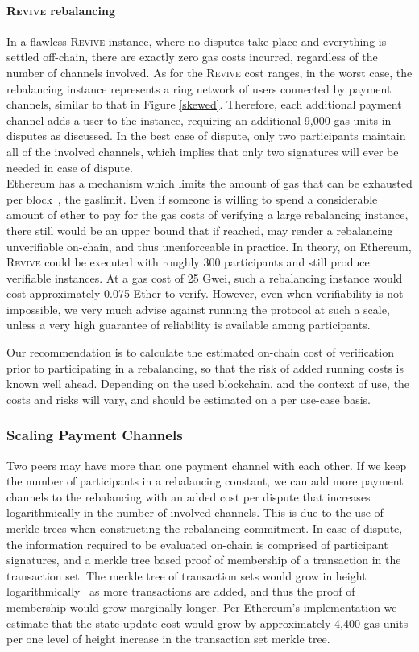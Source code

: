 \documentclass[sigconf]{acmart}
\newcommand{\name}{\textsc{Revive}\xspace}
\begin{document}
\paragraph{\name rebalancing}
In a flawless \name instance, where no disputes take place and everything is settled off-chain, there are exactly zero gas costs incurred, regardless of the number of channels involved.
As for the \name cost ranges, in the worst case, the rebalancing instance represents a ring network of users connected by payment channels, similar to that in Figure \ref{skewed}. Therefore, each additional payment channel adds a user to the instance, requiring an additional 9,000 gas units in disputes as discussed. In the best case of dispute, only two participants maintain all of the involved channels, which implies that only two signatures will ever be needed in case of dispute.\\

Ethereum has a mechanism which limits the amount of gas that can be exhausted per block~\cite{wood2014ethereum}, the gaslimit. Even if someone is willing to spend a considerable amount of ether to pay for the gas costs of verifying a large rebalancing instance, there still would be an upper bound that if reached, may render a rebalancing unverifiable on-chain, and thus unenforceable in practice.
In theory, on Ethereum, \name could be executed with roughly 300 participants and still produce verifiable instances. At a gas cost of 25 Gwei, such a rebalancing instance would cost approximately 0.075 Ether to verify. However, even when verifiability is not impossible, we very much advise against running the protocol at such a scale, unless a very high guarantee of reliability is available among participants.

Our recommendation is to calculate the estimated on-chain cost of verification prior to participating in a rebalancing, so that the risk of added running costs is known well ahead. Depending on the used blockchain, and the context of use, the costs and risks will vary, and should be estimated on a per use-case basis.

\subsubsection{Scaling Payment Channels}
Two peers may have more than one payment channel with each other. If we keep the number of participants in a rebalancing constant, we can add more payment channels to the rebalancing with an added cost per dispute that increases logarithmically in the number of involved channels. This is due to the use of merkle trees when constructing the rebalancing commitment. In case of dispute, the information required to be evaluated on-chain is comprised of participant signatures, and a merkle tree based proof of membership of a transaction in the transaction set. The merkle tree of transaction sets would grow in height logarithmically~\cite{Merkle1988} as more transactions are added, and thus the proof of membership would grow marginally longer.
Per Ethereum's implementation we estimate that the state update cost would grow by approximately 4,400 gas units per one level of height increase in the transaction set merkle tree.
\end{document}
